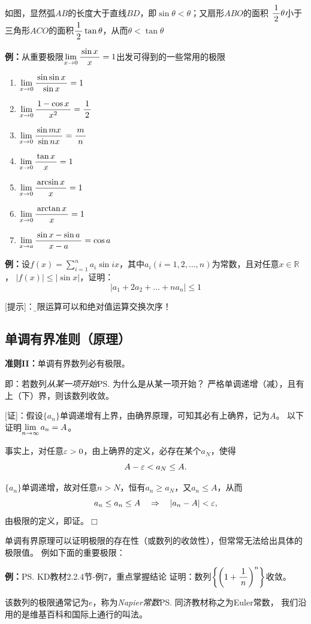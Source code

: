 如图，显然弧$AB$的长度大于直线$BD$，即$\sin\theta<\theta$；又扇形$ABO$的面积
$\displaystyle\frac{\,{1}\,}{\,{2}\,}\theta$小于三角形$ACO$的面积$\displaystyle\frac{\,{1}\,}{\,{2}\,}\tan\theta$，从而$\theta<\tan\theta$

{\b
{\bf 例：}从重要极限$\lim\limits_{x\to{0}}\displaystyle\frac{\,{\sin x}\,}{\,{x}\,}=1$出发可得到的一些常用的极限
\begin{enumerate}[(1)]
  \setlength{\itemindent}{1cm}
  \item $\lim\limits_{x\to{0}}\displaystyle\frac{\,{\sin\sin x}\,}{\,{\sin x}\,}=1$ 
  \item $\lim\limits_{x\to{0}}\displaystyle\frac{\,{1-\cos x}\,}{\,{x^2}\,}=\displaystyle\frac{\,{1}\,}{\,{2}\,}$ 
  \item $\lim\limits_{x\to{0}}\displaystyle\frac{\,{\sin mx}\,}{\,{\sin nx}\,}=\displaystyle\frac{\,{m}\,}{\,{n}\,}$
  \item $\lim\limits_{x\to{0}}\displaystyle\frac{\,{\tan x}\,}{\,{x}\,}=1$
  \item $\lim\limits_{x\to{0}}\displaystyle\frac{\,{\arcsin x}\,}{\,{x}\,}=1$
  \item $\lim\limits_{x\to{0}}\displaystyle\frac{\,{\arctan x}\,}{\,{x}\,}=1$
  \item $\lim\limits_{x\to{a}}\displaystyle\frac{\,{\sin x-\sin a}\,}{\,{x-a}\,}=\cos a$
\end{enumerate}
}

{\bf 例：}设$f(x)=\sum\limits_{i=1}^na_i\sin
ix$，其中$a_i(i=1,2,\ldots,n)$为常数，且对任意$x\in\mathbb{R}$， $|f(x)|\leq |\sin x|$，证明：
$$\left|a_1+2a_2+\ldots+na_n\right|\leq 1$$

[提示]：{\b 极限运算可以和绝对值运算交换次序！}

\subsection{单调有界准则（原理）}

{\bf 准则II：}单调有界数列必有极限。

即：若数列{\it 从某一项开始}\ps{为什么是从某一项开始？}
严格单调递增（减），且有上（下）界，则该数列收敛。

[证]：假设$\{a_n\}$单调递增有上界，由确界原理，可知其必有上确界，记为$A$。
以下证明$\lim\limits_{n\to\infty} a_n=A$。

事实上，对任意$\varepsilon>0$，由上确界的定义，必存在某个$a_N$，使得
$$A-\varepsilon<a_N\leq A.$$

$\{a_n\}$单调递增，故对任意$n>N$，恒有$a_n\geq a_N$，又$a_n\leq A$，从而
$$a_n\leq a_n\leq A\quad\Rightarrow\quad |a_n-A|<\varepsilon,$$
由极限的定义，即证。\hfill $\Box$

单调有界原理可以证明极限的存在性（或数列的收敛性），但常常无法给出具体的极限值。
例如下面的重要极限：

{\bf 例：}\ps{KD教材2.2.4节-例7，重点掌握结论}
证明：数列$\left\{\left(1+\displaystyle\frac{\,{1}\,}{\,{n}\,}\right)^n\right\}$收敛。

该数列的极限通常记为$e$，称为{\it Napier常数}\ps{同济教材称之为Euler常数，
我们沿用的是维基百科和国际上通行的叫法}。

